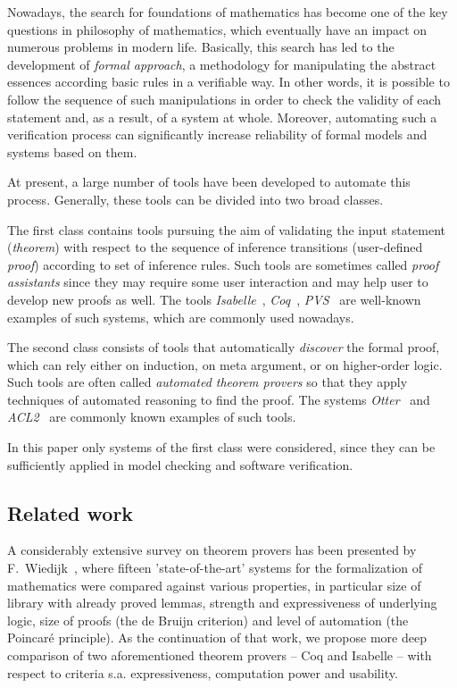 \documentclass[article]{aaltoseries}
\begin{document}
Nowadays, the search for foundations of mathematics has become one of the key questions in philosophy of mathematics, which eventually have an impact on numerous problems in modern life. Basically, this search has led to the development of \textit{formal approach}, a methodology for manipulating the abstract essences according basic rules in a verifiable way. In other words, it is possible to follow the sequence of such manipulations in order to check the validity of each statement and, as a result, of a system at whole. Moreover, automating such a verification process can significantly increase reliability of formal models and systems based on them.

At present, a large number of tools have been developed to automate this process. Generally, these tools can be divided into two broad classes. 

The first class contains tools pursuing the aim of validating the input statement (\textit{theorem}) with respect to the sequence of inference transitions (user-defined \textit{proof}) according to set of inference rules. Such tools are sometimes called \textit{proof assistants} since they may require some user interaction and may help user to develop new proofs as well. The tools \textit{Isabelle}~\cite{tool_Isabelle}, \textit{Coq}~\cite{tool_Coq}, \textit{PVS}~\cite{tool_Pvs} are well-known examples of such systems, which are commonly used nowadays.

The second class consists of tools that automatically \textit{discover} the formal proof, which can rely either on induction, on meta argument, or on higher-order logic. Such tools are often called \textit{automated theorem provers} so that they apply techniques of automated reasoning to find the proof. The systems \textit{Otter}~\cite{tool_Otter} and \textit{ACL2}~\cite{tool_Acl} are commonly known examples of such tools.

In this paper only systems of the first class were considered, since they can be sufficiently applied in model checking and software verification. 



\subsection{Related work}
A considerably extensive survey on theorem provers has been presented by F.~Wiedijk~\cite{Wie03}, where fifteen 'state-of-the-art' systems for the formalization of mathematics were compared against various properties, in particular size of library with already proved lemmas, strength and expressiveness of underlying logic, size of proofs (the de Bruijn criterion) and level of automation (the Poincaré principle). As the continuation of that work, we propose more deep comparison of two aforementioned theorem provers -- Coq and Isabelle -- with respect to criteria s.a. expressiveness, computation power and usability.
\end{document}
